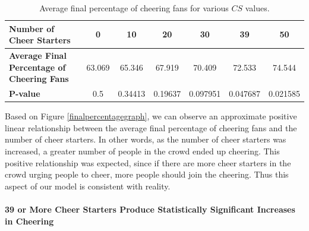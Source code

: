 \documentclass[oneside,12pt]{report}
\begin{document}
\begin{table}[h!]
\begin{center}
\begin{footnotesize}\begin{tabular}{|p{5cm}|c|c|c|c|c|c|}
\hline
\textbf{Number of Cheer Starters}&0&10&20&30&39&50\\\hline
\textbf{Average Final Percentage of Cheering Fans}&63.069&65.346&67.919&70.409&72.533&74.544\\\hline
\textbf{P-value}&0.5&0.34413&0.19637&0.097951&0.047687&0.021585\\\hline
\end{tabular}
\end{footnotesize}
\caption{Average final percentage of cheering fans for various $CS$ values.}
\label{finalpercenttable}
\end{center}
\end{table}

Based on Figure \ref{finalpercentagegraph}, we can observe an approximate positive linear relationship between the average final percentage of cheering fans and the number of cheer starters. In other words, as the number of cheer starters was increased, a greater number of people in the crowd ended up cheering. This positive relationship was expected, since if there are more cheer starters in the crowd urging people to cheer, more people should join the cheering. Thus this aspect of our model is consistent with reality. 
\paragraph{39 or More Cheer Starters Produce Statistically Significant Increases in Cheering }
\end{document}
